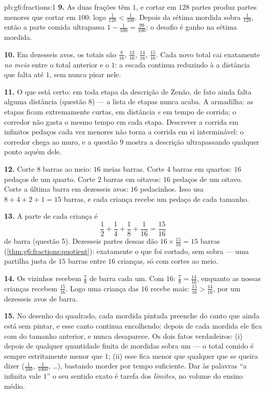 \begin{solution}{pb:g6:fractions:1}
\textbf{9.} As duas frações têm  $1$, e cortar em $128$ partes
produz partes menores que cortar em $100$: logo
$\frac{1}{128} < \frac{1}{100}$. Depois da sétima mordida sobra
$\frac{1}{128}$, então a parte comida ultrapassa
$1 - \frac{1}{100} = \frac{99}{100}$: o desafio é ganho na sétima
mordida.

\textbf{10.} Em dezesseis avos, os totais são $\frac{8}{16}$,
$\frac{12}{16}$, $\frac{14}{16}$, $\frac{15}{16}$. Cada novo total cai
exatamente \emph{no meio} entre o total anterior e o $1$: a escada
continua reduzindo à  a distância que falta até $1$, sem nunca
pisar nele.

\textbf{11.} O que está certo: em toda etapa da descrição de Zenão, de
fato ainda falta alguma distância (questão 8) --- a lista de etapas
nunca acaba. A armadilha: as etapas ficam extremamente curtas, em
distância \emph{e} em tempo de corrida; o corredor não gasta o mesmo
tempo em cada etapa. Descrever a corrida em infinitos pedaços cada vez
menores não torna a corrida em si interminável: o corredor chega ao
muro, e a questão 9 mostra a descrição ultrapassando qualquer ponto
aquém dele.

\textbf{12.} Corte $8$ barras ao meio: $16$ meias barras. Corte $4$
barras em quartos: $16$ pedaços de um quarto. Corte $2$ barras em
oitavos: $16$ pedaços de um oitavo. Corte a última barra em dezesseis
avos: $16$ pedacinhos. Isso usa $8 + 4 + 2 + 1 = 15$ barras, e cada
criança recebe um pedaço de cada tamanho.

\textbf{13.} A parte de cada criança é
\[
\frac12 + \frac14 + \frac18 + \frac{1}{16} = \frac{15}{16}
\]
de barra (questão 5). Dezesseis partes dessas dão
$16 \times \frac{15}{16} = 15$ barras
(\cref{thm:g6:fractions:quotient}): exatamente o que foi cortado, sem
sobra --- uma partilha justa de $15$ barras entre $16$ crianças, só com
cortes ao meio.

\textbf{14.} Os vizinhos recebem $\frac78$ de barra cada um. Com
 $16$: $\frac78 = \frac{14}{16}$, enquanto as nossas
crianças recebem $\frac{15}{16}$. Logo uma criança das $16$ recebe
mais: $\frac{15}{16} > \frac{14}{16}$, por um dezesseis avos de barra.

\textbf{15.} No desenho do quadrado, cada mordida pintada preenche
 do canto que ainda está sem pintar, e esse canto continua
encolhendo: depois de cada mordida ele fica com  do tamanho
anterior, e nunca desaparece. Os dois fatos verdadeiros: (i) depois de
qualquer quantidade finita de mordidas sobra um  --- o total
comido é sempre estritamente menor que $1$; (ii) esse  fica menor
que qualquer  que se queira dizer ($\frac{1}{100}$,
$\frac{1}{1000}$, \dots), bastando morder por tempo suficiente. Dar às
palavras ``a  infinita vale $1$'' o seu sentido exato é tarefa dos
\emph{limites}, no volume do ensino médio.
\end{solution}
